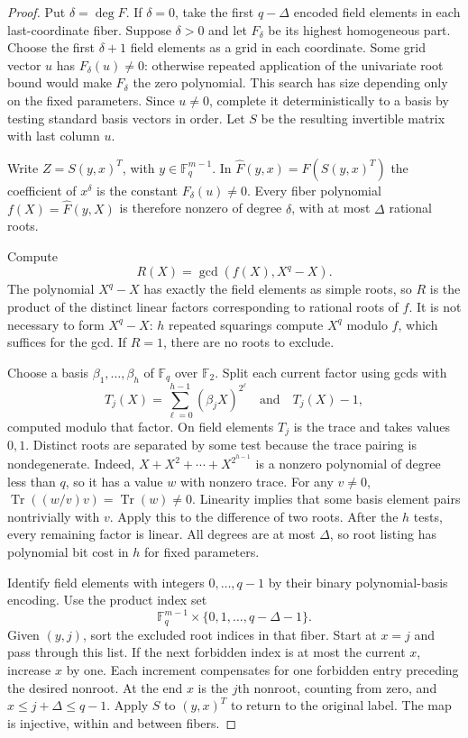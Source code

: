 \documentclass[11pt,a4paper]{article}
\newcommand{\F}{\mathbb F}
\DeclareMathOperator{\Tr}{Tr}
\theoremstyle{definition}
\theoremstyle{remark}
\numberwithin{equation}{section}
\begin{document}
\begin{proof}
Put $\delta=\deg F$. If $\delta=0$, take the first $q-\Delta$ encoded field elements in each last-coordinate fiber. Suppose $\delta>0$ and let $F_\delta$ be its highest homogeneous part. Choose the first $\delta+1$ field elements as a grid in each coordinate. Some grid vector $u$ has $F_\delta(u)\ne0$: otherwise repeated application of the univariate root bound would make $F_\delta$ the zero polynomial. This search has size depending only on the fixed parameters. Since $u\ne0$, complete it deterministically to a basis by testing standard basis vectors in order. Let $S$ be the resulting invertible matrix with last column $u$.

Write $Z=S(y,x)^T$, with $y\in\F_q^{m-1}$. In $\widehat F(y,x)=F(S(y,x)^T)$ the coefficient of $x^\delta$ is the constant $F_\delta(u)\ne0$. Every fiber polynomial $f(X)=\widehat F(y,X)$ is therefore nonzero of degree $\delta$, with at most $\Delta$ rational roots.

Compute
\[
R(X)=\gcd(f(X),X^q-X).
\]
The polynomial $X^q-X$ has exactly the field elements as simple roots, so $R$ is the product of the distinct linear factors corresponding to rational roots of $f$. It is not necessary to form $X^q-X$: $h$ repeated squarings compute $X^q$ modulo $f$, which suffices for the gcd. If $R=1$, there are no roots to exclude.

Choose a basis $\beta_1,\ldots,\beta_h$ of $\F_q$ over $\F_2$. Split each current factor using gcds with
\begin{equation}\label{eq:trace-split}
T_j(X)=\sum_{\ell=0}^{h-1}(\beta_jX)^{2^\ell}
\quad\text{and}\quad T_j(X)-1,
\end{equation}
computed modulo that factor. On field elements $T_j$ is the trace and takes values $0,1$. Distinct roots are separated by some test because the trace pairing is nondegenerate. Indeed, $X+X^2+\cdots+X^{2^{h-1}}$ is a nonzero polynomial of degree less than $q$, so it has a value $w$ with nonzero trace. For any $v\ne0$, $\Tr((w/v)v)=\Tr(w)\ne0$. Linearity implies that some basis element pairs nontrivially with $v$. Apply this to the difference of two roots. After the $h$ tests, every remaining factor is linear. All degrees are at most $\Delta$, so root listing has polynomial bit cost in $h$ for fixed parameters.

Identify field elements with integers $0,\ldots,q-1$ by their binary polynomial-basis encoding. Use the product index set
\begin{equation}\label{eq:product-labels}
\F_q^{m-1}\times\{0,1,\ldots,q-\Delta-1\}.
\end{equation}
Given $(y,j)$, sort the excluded root indices in that fiber. Start at $x=j$ and pass through this list. If the next forbidden index is at most the current $x$, increase $x$ by one. Each increment compensates for one forbidden entry preceding the desired nonroot. At the end $x$ is the $j$th nonroot, counting from zero, and $x\le j+\Delta\le q-1$. Apply $S$ to $(y,x)^T$ to return to the original label. The map is injective, within and between fibers.


\end{proof}
\end{document}
